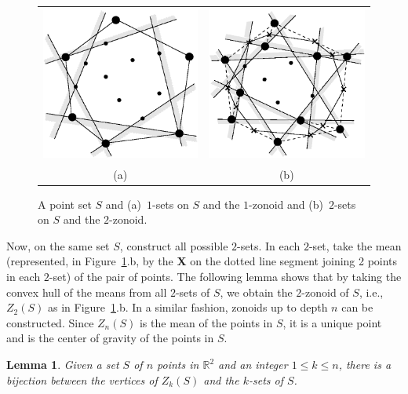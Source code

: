 \documentclass{elsart}
\newtheorem{lemma}{Lemma}
\begin{document}
\begin{figure}
 \begin{center}
   \begin{tabular}{cc}
   \includegraphics[height=2in]{fig1}
    & 
   \includegraphics[height=2in]{fig2} \\
   (a) & (b)
   \end{tabular}
   \caption{A point set $S$ and (a)~$1$-sets on $S$ and the $1$-zonoid
      and (b)~$2$-sets on $S$ and the $2$-zonoid.}
   \label{fig_1_set}
 \end{center}
\end{figure}

Now, on the same set $S$, construct all possible $2$-sets. In each
$2$-set, take the mean (represented, in Figure~\ref{fig_1_set}.b, by the
\textbf{X} on the dotted line segment joining 2 points in each
$2$-set) of the pair of points.  The following lemma shows that by
taking the convex hull of the means from all $2$-sets of $S$, we
obtain the $2$-zonoid of $S$, i.e., $Z_2(S)$ as in
Figure~\ref{fig_1_set}.b.  In a similar fashion, zonoids up to depth $n$ can be
constructed.  Since $Z_n(S)$ is the mean of the points in $S$, it is a
unique point and is the center of gravity of the points in $S$.

\begin{lemma}\label{lemma_bijection}
Given a set $S$ of $n$ points in $\mathbb{R}^2$ and an integer $1 \le
k \le n$, there is a bijection between the vertices of $Z_k(S)$ and
the $k$-sets of $S$.
\end{lemma}
\end{document}
